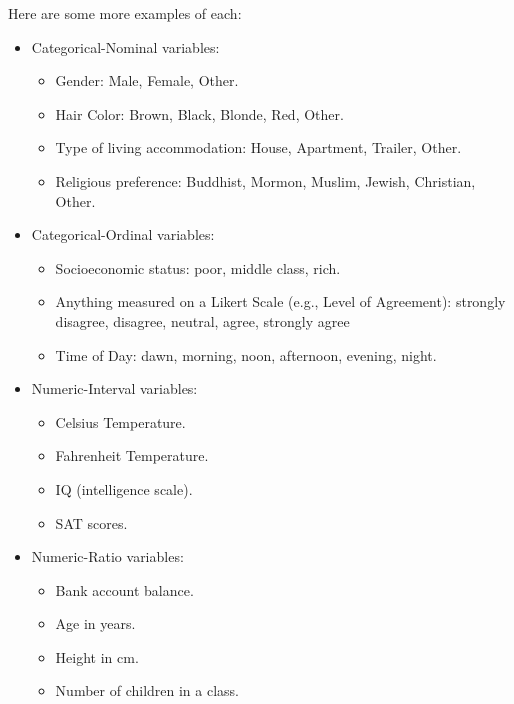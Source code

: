 \documentclass[
]{book}
\providecommand{\tightlist}{%
  \setlength{\itemsep}{0pt}\setlength{\parskip}{0pt}}
\begin{document}
Here are some more examples of each:

\begin{itemize}
\tightlist
\item
  Categorical-Nominal variables:

  \begin{itemize}
  \tightlist
  \item
    Gender: Male, Female, Other.
  \item
    Hair Color: Brown, Black, Blonde, Red, Other.
  \item
    Type of living accommodation: House, Apartment, Trailer, Other.
  \item
    Religious preference: Buddhist, Mormon, Muslim, Jewish, Christian, Other.
  \end{itemize}
\item
  Categorical-Ordinal variables:

  \begin{itemize}
  \tightlist
  \item
    Socioeconomic status: poor, middle class, rich.
  \item
    Anything measured on a Likert Scale (e.g., Level of Agreement): strongly disagree, disagree, neutral, agree, strongly agree
  \item
    Time of Day: dawn, morning, noon, afternoon, evening, night.
  \end{itemize}
\item
  Numeric-Interval variables:

  \begin{itemize}
  \tightlist
  \item
    Celsius Temperature.
  \item
    Fahrenheit Temperature.
  \item
    IQ (intelligence scale).
  \item
    SAT scores.
  \end{itemize}
\item
  Numeric-Ratio variables:

  \begin{itemize}
  \tightlist
  \item
    Bank account balance.
  \item
    Age in years.
  \item
    Height in cm.
  \item
    Number of children in a class.
  \end{itemize}
\end{itemize}
\end{document}

